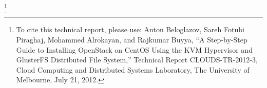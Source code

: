 \thanks{To cite this technical report, please use: Anton Beloglazov, Sareh Fotuhi Piraghaj, Mohammed Alrokayan, and Rajkumar Buyya, ``A Step-by-Step Guide to Installing OpenStack on CentOS Using the KVM Hypervisor and GlusterFS Distributed File System,'' Technical Report CLOUDS-TR-2012-3, Cloud Computing and Distributed Systems Laboratory, The University of Melbourne, July 21, 2012.}
